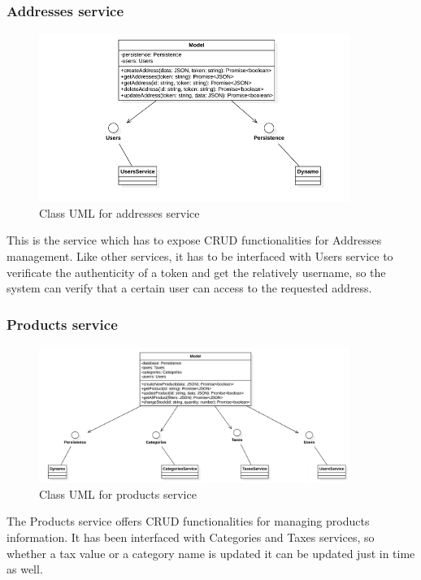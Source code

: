\subsubsection{Addresses service}
\begin{figure}[H]
    \includegraphics[width=0.9\textwidth]{res/images/class-diagrams/addresses.png}
    \caption{Class UML for addresses service}
\end{figure}
This is the service which has to expose CRUD functionalities for Addresses management. Like other services, it has to be interfaced with Users service to verificate the
authenticity of a token and get the relatively username, so the system can verify that a certain user can access to the requested address. 

\subsubsection{Products service}
\begin{figure}[H]
    \includegraphics[width=0.9\textwidth]{res/images/class-diagrams/products.png}
    \caption{Class UML for products service}
\end{figure}
The Products service offers CRUD functionalities for managing products information. It has been interfaced with Categories and Taxes services, so whether a tax value or a category name
is updated it can be updated just in time as well.

